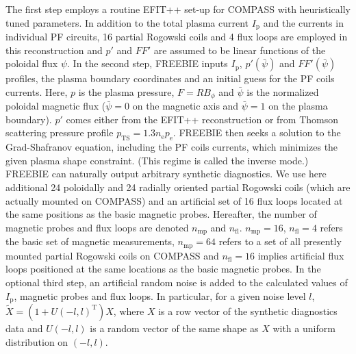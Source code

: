 The first step employs a routine EFIT++ set-up for COMPASS with heuristically tuned parameters. In addition to the total plasma current $I_\mathrm{p}$ and the currents in individual PF circuits, 16 partial Rogowski coils and 4 flux loops are employed in this reconstruction and $p'$ and $FF'$ are assumed to be linear functions of the poloidal flux $\psi$.
In the second step, FREEBIE inputs $I_\mathrm{p}$, $p'\left( {\bar \psi } \right)$ and $FF'\left( {\bar \psi } \right)$ profiles, the plasma boundary coordinates and an initial guess for the PF coils currents. Here, $p$ is the plasma pressure, $F = RB_\phi$ and $\bar\psi$ is the normalized poloidal magnetic flux ($\bar\psi = 0$ on the magnetic axis and $\bar\psi = 1$ on the plasma boundary). $p'$ comes either from the EFIT++ reconstruction or from Thomson scattering pressure profile $p_\mathrm{TS} = 1.3 n_\mathrm{e} p_\mathrm{e}$. FREEBIE then seeks a solution to the Grad-Shafranov equation, including the PF coils currents, which minimizes the given plasma shape constraint. (This regime is called the inverse mode.) FREEBIE can naturally output arbitrary synthetic diagnostics. We use here additional 24 poloidally and 24 radially oriented partial Rogowski coils (which are actually mounted on COMPASS) and an artificial set of 16 flux loops located at the same positions as the basic magnetic probes. Hereafter, the number of magnetic probes and flux loops are denoted $n_\mathrm{mp}$ and $n_\mathrm{fl}$. $n_\mathrm{mp}=16$, $n_\mathrm{fl}=4$ refers the basic set of magnetic measurements, $n_\mathrm{mp}=64$ refers to a set of all presently mounted partial Rogowski coils on COMPASS and $n_\mathrm{fl}=16$ implies artificial flux loops positioned at the same locations as the basic magnetic probes.
In the optional third step, an artificial random noise is added to the calculated values of $I_\mathrm{p}$, magnetic probes and flux loops. In particular, for a given noise level $l$, $\tilde X = \left( {1 + U\left( { - l,l} \right)^\mathrm{T}} \right)X$, where $X$ is a row vector of the synthetic diagnostics data and $U\left( { - l,l} \right)$ is a random vector of the same shape as $X$ with a uniform distribution on $\left( { - l,l} \right)$.

